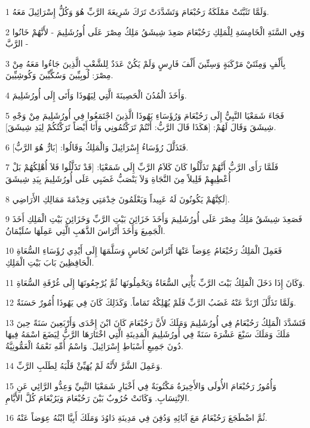 \par 1 وَلَمَّا تَثَبَّتَتْ مَمْلَكَةُ رَحُبْعَامَ وَتَشَدَّدَتْ تَرَكَ شَرِيعَةَ الرَّبِّ هُوَ وَكُلُّ إِسْرَائِيلَ مَعَهُ.
\par 2 وَفِي السَّنَةِ الْخَامِسَةِ لِلْمَلِكِ رَحُبْعَامَ صَعِدَ شِيشَقُ مَلِكُ مِصْرَ عَلَى أُورُشَلِيمَ - لأَنَّهُمْ خَانُوا الرَّبَّ -
\par 3 بِأَلْفٍ وَمِئَتَيْ مَرْكَبَةٍ وَسِتِّينَ أَلْفَ فَارِسٍ وَلَمْ يَكُنْ عَدَدٌ لِلشَّعْبِ الَّذِينَ جَاءُوا مَعَهُ مِنْ مِصْرَ: لُوبِيِّينَ وَسُكِّيِّينَ وَكُوشِيِّينَ.
\par 4 وَأَخَذَ الْمُدُنَ الْحَصِينَةَ الَّتِي لِيَهُوذَا وَأَتَى إِلَى أُورُشَلِيمَ.
\par 5 فَجَاءَ شَمَعْيَا النَّبِيُّ إِلَى رَحُبْعَامَ وَرُؤَسَاءِ يَهُوذَا الَّذِينَ اجْتَمَعُوا فِي أُورُشَلِيمَ مِنْ وَجْهِ شِيشَقَ وَقَالَ لَهُمْ: [هَكَذَا قَالَ الرَّبُّ: أَنْتُمْ تَرَكْتُمُونِي وَأَنَا أَيْضاً تَرَكْتُكُمْ لِيَدِ شِيشَقَ].
\par 6 فَتَذَلَّلَ رُؤَسَاءُ إِسْرَائِيلَ وَالْمَلِكُ وَقَالُوا: [بَارٌّ هُوَ الرَّبُّ].
\par 7 فَلَمَّا رَأَى الرَّبُّ أَنَّهُمْ تَذَلَّلُوا كَانَ كَلاَمُ الرَّبِّ إِلَى شَمَعْيَا: [قَدْ تَذَلَّلُوا فَلاَ أُهْلِكُهُمْ بَلْ أُعْطِيهِمْ قَلِيلاً مِنَ النَّجَاةِ وَلاَ يَنْصَبُّ غَضَبِي عَلَى أُورُشَلِيمَ بِيَدِ شِيشَقَ
\par 8 لَكِنَّهُمْ يَكُونُونَ لَهُ عَبِيداً وَيَعْلَمُونَ خِدْمَتِي وَخِدْمَةَ مَمَالِكِ الأَرَاضِي].
\par 9 فَصَعِدَ شِيشَقُ مَلِكُ مِصْرَ عَلَى أُورُشَلِيمَ وَأَخَذَ خَزَائِنَ بَيْتِ الرَّبِّ وَخَزَائِنَ بَيْتِ الْمَلِكِ أَخَذَ الْجَمِيعَ وَأَخَذَ أَتْرَاسَ الذَّهَبِ الَّتِي عَمِلَهَا سُلَيْمَانُ.
\par 10 فَعَمِلَ الْمَلِكُ رَحُبْعَامُ عِوَضاً عَنْهَا أَتْرَاسَ نُحَاسٍ وَسَلَّمَهَا إِلَى أَيْدِي رُؤَسَاءِ السُّعَاةِ الْحَافِظِينَ بَابَ بَيْتِ الْمَلِكِ.
\par 11 وَكَانَ إِذَا دَخَلَ الْمَلِكُ بَيْتَ الرَّبِّ يَأْتِي السُّعَاةُ وَيَحْمِلُونَهَا ثُمَّ يُرْجِعُونَهَا إِلَى غُرْفَةِ السُّعَاةِ.
\par 12 وَلَمَّا تَذَلَّلَ ارْتَدَّ عَنْهُ غَضَبُ الرَّبِّ فَلَمْ يُهْلِكْهُ تَمَاماً. وَكَذَلِكَ كَانَ فِي يَهُوذَا أُمُورٌ حَسَنَةٌ.
\par 13 فَتَشَدَّدَ الْمَلِكُ رَحُبْعَامُ فِي أُورُشَلِيمَ وَمَلَكَ لأَنَّ رَحُبْعَامَ كَانَ ابْنَ إِحْدَى وَأَرْبَعِينَ سَنَةً حِينَ مَلَكَ وَمَلَكَ سَبْعَ عَشْرَةَ سَنَةً فِي أُورُشَلِيمَ الْمَدِينَةِ الَّتِي اخْتَارَهَا الرَّبُّ لِيَضَعَ اسْمَهُ فِيهَا دُونَ جَمِيعِ أَسْبَاطِ إِسْرَائِيلَ. وَاسْمُ أُمِّهِ نَعْمَةُ الْعَمُّونِيَّةُ.
\par 14 وَعَمِلَ الشَّرَّ لأَنَّهُ لَمْ يُهَيِّئْ قَلْبَهُ لِطَلَبِ الرَّبِّ.
\par 15 وَأُمُورُ رَحُبْعَامَ الأُولَى وَالأَخِيرَةُ مَكْتُوبَةٌ فِي أَخْبَارِ شَمَعْيَا النَّبِيِّ وَعِدُّو الرَّائِي عَنِ الاِنْتِسَابِ. وَكَانَتْ حُرُوبٌ بَيْنَ رَحُبْعَامَ وَيَرُبْعَامَ كُلَّ الأَيَّامِ.
\par 16 ثُمَّ اضْطَجَعَ رَحُبْعَامُ مَعَ آبَائِهِ وَدُفِنَ فِي مَدِينَةِ دَاوُدَ وَمَلَكَ أَبِيَّا ابْنُهُ عِوَضاً عَنْهُ.

